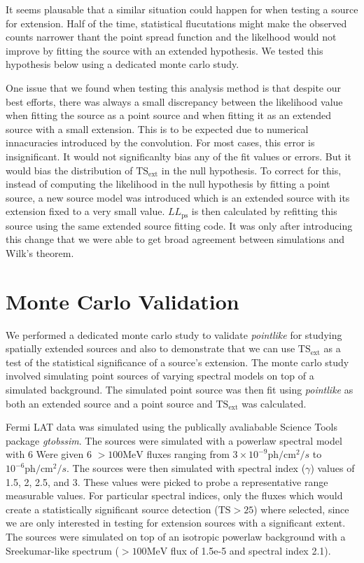 \documentclass[preprint]{aastex}
\newcommand{\mev}{\text{MeV}\xspace}
\newcommand{\ph}{\text{ph}\xspace}
\newcommand{\cm}{\text{cm}\xspace}
\newcommand{\tsext}{\ensuremath{\text{TS}_\text{ext}}\xspace}
\newcommand{\ts}{\text{TS}\xspace}
\newcommand{\pointlike}{{\em pointlike}\xspace}
\begin{document}
It seems plausable that a similar situation could happen for when testing
a source for extension. Half of the time, statistical flucutations might
make the observed counts narrower thant the point spread function and
the likelhood would not improve by fitting the source with an extended
hypothesis. We tested this hypothesis below using a dedicated monte
carlo study.

One issue that we found when testing this analysis method is that
despite our best efforts, there was always a small discrepancy between
the likelihood value when fitting the source as a point source and when
fitting it as an extended source with a small extension.  This is to be
expected due to numerical innacuracies introduced by the convolution.
For most cases, this error is insignificant. It would not significanlty
bias any of the fit values or errors. But it would bias the distribution
of $\tsext$ in the null hypothesis. To correct for this,
instead of computing the likelihood in the null hypothesis by fitting
a point source, a new source model was introduced which is an extended
source with its extension fixed to a very small value. $LL_\text{ps}$
is then calculated by refitting this source using the same extended
source fitting code. It was only after introducing this change that we
were able to get broad agreement between simulations and Wilk's theorem.

\section{Monte Carlo Validation}\label{monte_carlo_validation}

We performed a dedicated monte carlo study to validate \pointlike for
studying spatially extended sources and also to demonstrate that we can
use $\tsext$ as a test of the statistical significance
of a source's extension.  The monte carlo study involved simulating point
sources of varying spectral models on top of a simulated background. The
simulated point source was then fit using \pointlike as both an extended
source and a point source and $\tsext$ was calculated.

Fermi LAT data was simulated using the publically avaliabable Science
Tools package {\em gtobssim}\cite{GTOBSSIM_CITATION}. The sources were
simulated with a powerlaw spectral model with 6 Were given 6 $>100\mev$
fluxes ranging from $3\times 10^{-9} \ph/\cm^2/s$ to 
$10^{-6} \ph/\cm^2/s$.
The sources were then simulated with spectral index ($\gamma$) values of
1.5, 2, 2.5, and 3.  These values were picked to probe a representative
range measurable values.  For particular spectral indices, only the
fluxes which would create a statistically significant source detection
($\ts>25$) where selected, since we are only interested in
testing for extension sources with a significant extent. The sources were
simulated on top of an isotropic powerlaw background with a Sreekumar-like
spectrum ($>100\mev$ flux of 1.5e-5 and spectral index 2.1).\cite{Sreekumar
et al. ApJ 494 pag 523 1998}
\end{document}
